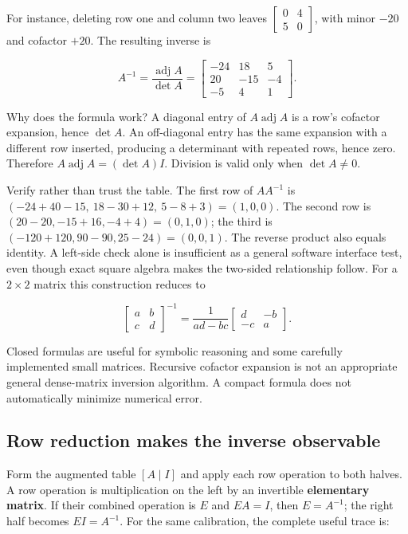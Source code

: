 For instance, deleting row one and column two leaves \(\begin{bmatrix}0&4\\5&0\end{bmatrix}\), with minor \(-20\) and cofactor \(+20\). The resulting inverse is

\[
A^{-1}=\frac{\operatorname{adj}A}{\det A}
=\begin{bmatrix}-24&18&5\\20&-15&-4\\-5&4&1\end{bmatrix}.
\]

Why does the formula work? A diagonal entry of \(A\operatorname{adj}A\) is a row's cofactor expansion, hence \(\det A\). An off-diagonal entry has the same expansion with a different row inserted, producing a determinant with repeated rows, hence zero. Therefore \(A\operatorname{adj}A=(\det A)I\). Division is valid only when \(\det A\ne0\).

Verify rather than trust the table. The first row of \(AA^{-1}\) is \((-24+40-15,\ 18-30+12,\ 5-8+3)=(1,0,0)\). The second row is \((20-20,-15+16,-4+4)=(0,1,0)\); the third is \((-120+120,90-90,25-24)=(0,0,1)\). The reverse product also equals identity. A left-side check alone is insufficient as a general software interface test, even though exact square algebra makes the two-sided relationship follow. For a \(2\times2\) matrix this construction reduces to

\[
\begin{bmatrix}a&b\\c&d\end{bmatrix}^{-1}
=\frac1{ad-bc}\begin{bmatrix}d&-b\\-c&a\end{bmatrix}.
\]

Closed formulas are useful for symbolic reasoning and some carefully implemented small matrices. Recursive cofactor expansion is not an appropriate general dense-matrix inversion algorithm. A compact formula does not automatically minimize numerical error.

\subsection{Row reduction makes the inverse observable}\label{01-foundations-i-ch018-row-reduction-makes-the-inverse-observable}

Form the augmented table \([A\mid I]\) and apply each row operation to both halves. A row operation is multiplication on the left by an invertible \textbf{elementary matrix}. If their combined operation is \(E\) and \(EA=I\), then \(E=A^{-1}\); the right half becomes \(EI=A^{-1}\). For the same calibration, the complete useful trace is:

